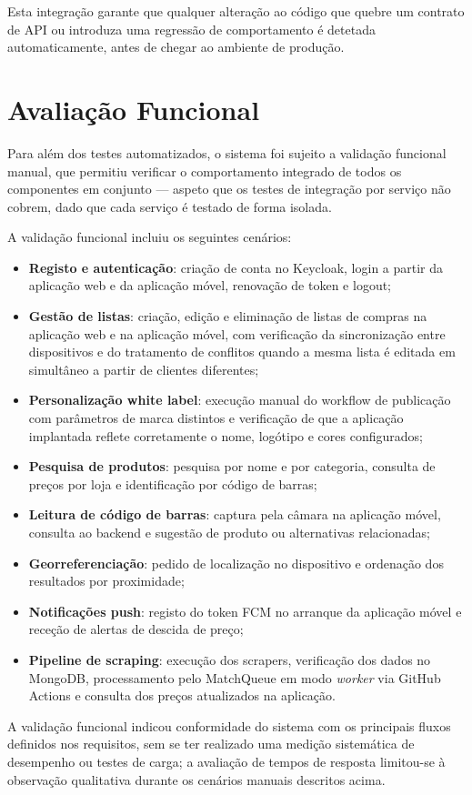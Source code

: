 Esta integração garante que qualquer alteração ao código que quebre um contrato de API ou introduza uma regressão de comportamento é detetada automaticamente, antes de chegar ao ambiente de produção.

\section{Avaliação Funcional}
\label{sec:6.5}

Para além dos testes automatizados, o sistema foi sujeito a validação funcional manual, que permitiu verificar o comportamento integrado de todos os componentes em conjunto — aspeto que os testes de integração por serviço não cobrem, dado que cada serviço é testado de forma isolada.

A validação funcional incluiu os seguintes cenários:

\begin{itemize}
    \item \textbf{Registo e autenticação}: criação de conta no Keycloak, login a partir da aplicação web e da aplicação móvel, renovação de token e logout;
    \item \textbf{Gestão de listas}: criação, edição e eliminação de listas de compras na aplicação web e na aplicação móvel, com verificação da sincronização entre dispositivos e do tratamento de conflitos quando a mesma lista é editada em simultâneo a partir de clientes diferentes;
    \item \textbf{Personalização white label}: execução manual do workflow de publicação com parâmetros de marca distintos e verificação de que a aplicação implantada reflete corretamente o nome, logótipo e cores configurados;
    \item \textbf{Pesquisa de produtos}: pesquisa por nome e por categoria, consulta de preços por loja e identificação por código de barras;
    \item \textbf{Leitura de código de barras}: captura pela câmara na aplicação móvel, consulta ao backend e sugestão de produto ou alternativas relacionadas;
    \item \textbf{Georreferenciação}: pedido de localização no dispositivo e ordenação dos resultados por proximidade;
    \item \textbf{Notificações push}: registo do token FCM no arranque da aplicação móvel e receção de alertas de descida de preço;
    \item \textbf{Pipeline de scraping}: execução dos scrapers, verificação dos dados no MongoDB, processamento pelo MatchQueue em modo \textit{worker} via GitHub Actions e consulta dos preços atualizados na aplicação.
\end{itemize}

A validação funcional indicou conformidade do sistema com os principais fluxos definidos nos requisitos, sem se ter realizado uma medição sistemática de desempenho ou testes de carga; a avaliação de tempos de resposta limitou-se à observação qualitativa durante os cenários manuais descritos acima.
